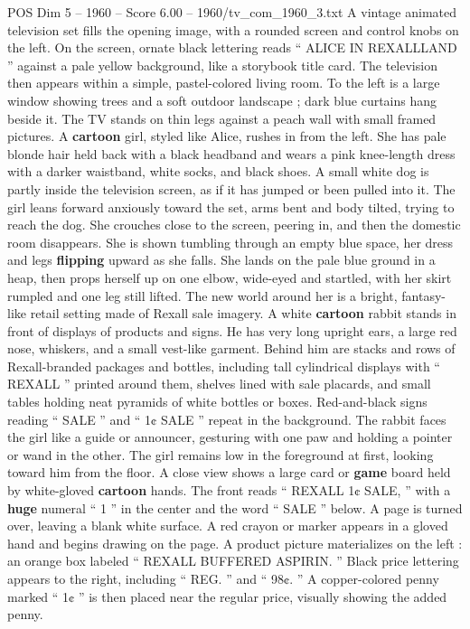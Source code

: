 \begin{textsample}{POS Dim 5 – 1960 – Score 6.00 – 1960/tv\_com\_1960\_3.txt}  \label{ex:f5_pos_055}
A vintage animated television set fills the opening image, with a rounded screen and control knobs on the left.
On the screen, ornate black lettering reads “ ALICE IN REXALLLAND ” against a pale yellow background, like a storybook title card.
The television then appears within a simple, pastel-colored living room.
To the left is a large window showing trees and a soft outdoor landscape ; dark blue curtains hang beside it.
The TV stands on thin legs against a peach wall with small framed pictures.
A \textbf{cartoon} girl, styled like Alice, rushes in from the left.
She has pale blonde hair held back with a black headband and wears a pink knee-length dress with a darker waistband, white socks, and black shoes.
A small white dog is partly inside the television screen, as if it has jumped or been pulled into it.
The girl leans forward anxiously toward the set, arms bent and body tilted, trying to reach the dog.
She crouches close to the screen, peering in, and then the domestic room disappears.
She is shown tumbling through an empty blue space, her dress and legs \textbf{flipping} upward as she falls.
She lands on the pale blue ground in a heap, then props herself up on one elbow, wide-eyed and startled, with her skirt rumpled and one leg still lifted.
The new world around her is a bright, fantasy-like retail setting made of Rexall sale imagery.
A white \textbf{cartoon} rabbit stands in front of displays of products and signs.
He has very long upright ears, a large red nose, whiskers, and a small vest-like garment.
Behind him are stacks and rows of Rexall-branded packages and bottles, including tall cylindrical displays with “ REXALL ” printed around them, shelves lined with sale placards, and small tables holding neat pyramids of white bottles or boxes.
Red-and-black signs reading “ SALE ” and “ 1¢ SALE ” repeat in the background.
The rabbit faces the girl like a guide or announcer, gesturing with one paw and holding a pointer or wand in the other.
The girl remains low in the foreground at first, looking toward him from the floor.
A close view shows a large card or \textbf{game} board held by white-gloved \textbf{cartoon} hands.
The front reads “ REXALL 1¢ SALE, ” with a \textbf{huge} numeral “ 1 ” in the center and the word “ SALE ” below.
A page is turned over, leaving a blank white surface.
A red crayon or marker appears in a gloved hand and begins drawing on the page.
A product picture materializes on the left : an orange box labeled “ REXALL BUFFERED ASPIRIN. ” Black price lettering appears to the right, including “ REG. ” and “ 98¢. ” A copper-colored penny marked “ 1¢ ” is then placed near the regular price, visually showing the added penny.

\end{textsample}
